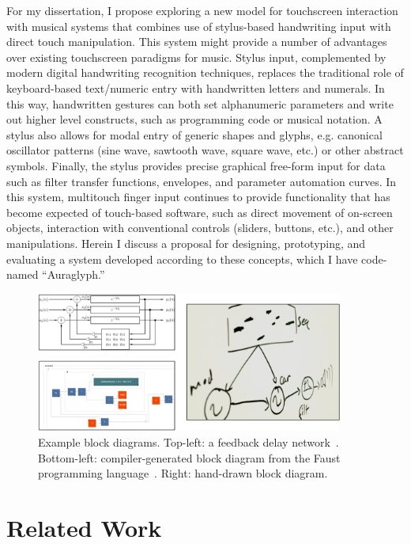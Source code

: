 \documentclass[10pt,letterpaper]{article}
\begin{document}
For my dissertation, I propose exploring a new model for touchscreen interaction with musical systems that combines use of stylus-based handwriting input with direct touch manipulation. 
This system might provide a number of advantages over existing touchscreen paradigms for music. 
Stylus input, complemented by modern digital handwriting recognition techniques, replaces the traditional role of keyboard-based text/numeric entry with handwritten letters and numerals.
In this way, handwritten gestures can both set alphanumeric parameters and write out higher level constructs, such as programming code or musical notation. 
A stylus also allows for modal entry of generic shapes and glyphs, e.g. canonical oscillator patterns (sine wave, sawtooth wave, square wave, etc.) or other abstract symbols.
Finally, the stylus provides precise graphical free-form input for data such as filter transfer functions, envelopes, and parameter automation curves. 
In this system, multitouch finger input continues to provide functionality that has become expected of touch-based software, such as direct movement of on-screen objects, interaction with conventional controls (sliders, buttons, etc.), and other manipulations. 
Herein I discuss a proposal for designing, prototyping, and evaluating a system developed according to these concepts, which I have code-named ``Auraglyph.'' 

\begin{figure}[h!]
	\centering
		\includegraphics[width=0.9\textwidth]{figures/block.png}
	\caption{Example block diagrams. Top-left: a feedback delay network\protect~\cite{smith2010pasp}. Bottom-left: compiler-generated block diagram from the Faust programming language\protect~\cite{faustOnline}. Right: hand-drawn block diagram.}
	\label{fig:blockDiagram}
\end{figure}

\section{Related Work}
\label{sec:RelatedWork}
\end{document}
